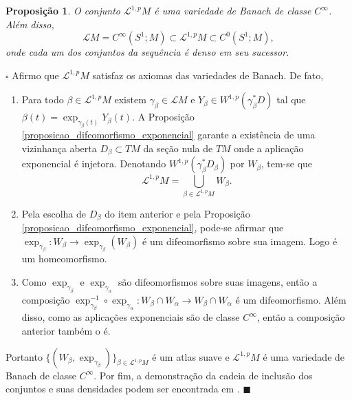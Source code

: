 \documentclass[12pt]{book}
\newtheorem{proposicao}[teorema]{Proposição}
\newenvironment{prova}[1]{$\square$ #1}{\hfill$\blacksquare$}
\newcommand{\caminhosexponenciaisSobolev}{\mathcal{L}^{1,p}M}
\newcommand{\circulo}{S^{1}}
\newcommand{\espacosobolev}[1]{W^{1,p}(#1)}
\newcommand{\lacocontrateis}{\mathcal{L}M}
\begin{document}
	\begin{proposicao}\label{proposicao_caminhos_variedade_banach}
		O conjunto $\caminhosexponenciaisSobolev$ é uma variedade de Banach de classe $C^{\infty}$. Além disso, 
		$$
		\lacocontrateis = C^{\infty}(\circulo;M) \subset  \caminhosexponenciaisSobolev\subset C^{0}(\circulo;M),
		$$
		onde cada um dos conjuntos da sequência é denso em seu sucessor.
	\end{proposicao}
	\begin{prova}
		Afirmo que $\caminhosexponenciaisSobolev$ satisfaz os axiomas das variedades de Banach. De fato,
		\begin{enumerate}
			\item Para todo $\beta \in \caminhosexponenciaisSobolev $ existem $\gamma_{\beta} \in \lacocontrateis$ e $Y_{\beta} \in \espacosobolev{\gamma_{\beta}^{*}D}$ tal que $\beta(t)=\exp_{\gamma_{\beta}(t)}Y_{\beta}(t)$. A Proposição \ref{proposicao_difeomorfismo_exponencial} garante a existência de uma vizinhança aberta $D_{\beta} \subset TM$ da seção nula de $TM$ onde a aplicação exponencial é injetora. Denotando $\espacosobolev{\gamma_{\beta}^{*}D_{\beta}}$ por $W_{\beta}$, tem-se que
			$$
			\caminhosexponenciaisSobolev = \bigcup_{\beta \in \caminhosexponenciaisSobolev } W_{\beta}.
			$$
			
			\item Pela escolha de $D_{\beta}$ do item anterior e pela Proposição \ref{proposicao_difeomorfismo_exponencial}, pode-se afirmar que $\exp_{\gamma_{\beta}}:W_{\beta} \to \exp_{\gamma_{\beta}}(W_{\beta})$ é um difeomorfismo sobre sua imagem. Logo é um homeomorfismo.
			
			\item Como $\exp_{\gamma_{\beta}}$ e $\exp_{\gamma_{\alpha}}$ são difeomorfismos sobre suas imagens, então a composição $\exp_{\gamma_{\beta}}^{-1} \circ \exp_{\gamma_{\alpha}} :W_{\beta} \cap W_{\alpha} \to W_{\beta} \cap W_{\alpha}$ é um difeomorfismo. Além disso, como as aplicações exponenciais são de classe $C^{\infty}$, então a composição anterior também o é.
		\end{enumerate}
		
		Portanto $\{(W_{\beta}, \exp_{\gamma_{\beta}}) \}_{\beta \in \caminhosexponenciaisSobolev}$ é um atlas suave e $\caminhosexponenciaisSobolev$ é uma variedade de Banach de classe $C^{\infty}$. Por fim, a demonstração da cadeia de inclusão dos conjuntos e suas densidades podem ser encontrada em \cite{matthias_morse_homology}.
	\end{prova}
	
\end{document}
